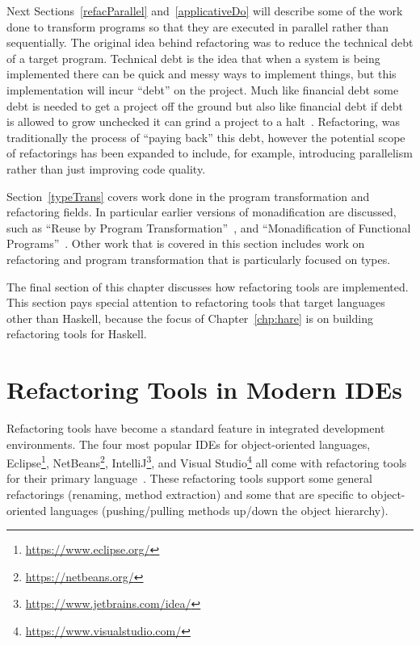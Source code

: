 Next Sections~\ref{refacParallel} and~\ref{applicativeDo} will describe some of the work done to transform programs so that they are executed in parallel rather than sequentially. The original idea behind refactoring was to reduce the technical debt of a target program. Technical debt is the idea that when a system is being implemented there can be quick and messy ways to implement things, but this implementation will incur ``debt'' on the project. Much like financial debt some debt is needed to get a project off the ground but also like financial debt if debt is allowed to grow unchecked it can grind a project to a halt~\citep{techDebt}. Refactoring, was traditionally the process of ``paying back'' this debt, however the potential scope of refactorings has been expanded to include, for example, introducing parallelism rather than just improving code quality. 

Section~\ref{typeTrans} covers work done in the program transformation and refactoring fields. In particular earlier versions of monadification are discussed, such as ``Reuse by Program Transformation''~\citep{lammelReuse}, and ``Monadification of Functional Programs''~\citep{monadification}. Other work that is covered in this section includes work on refactoring and program transformation that is particularly focused on types.

The final section of this chapter discusses how refactoring tools are implemented. This section pays special attention to refactoring tools that target languages other than Haskell, because the focus of Chapter~\ref{chp:hare} is on building refactoring tools for Haskell.

\section{Refactoring Tools in Modern IDEs}\label{ideTools}
Refactoring tools have become a standard feature in integrated development environments. The four most popular IDEs for object-oriented languages, Eclipse\footnote{\url{https://www.eclipse.org/}}, NetBeans\footnote{\url{https://netbeans.org/}}, IntelliJ\footnote{\url{https://www.jetbrains.com/idea/}}, and Visual Studio\footnote{\url{https://www.visualstudio.com/}} all come with refactoring tools for their primary language~\citep{ides}. These refactoring tools support some general refactorings (renaming, method extraction) and some that are specific to object-oriented languages (pushing/pulling methods up/down the object hierarchy). 

